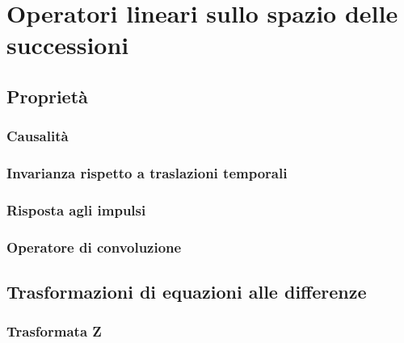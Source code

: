 

\chapter{Operatori lineari sullo spazio delle successioni}
\label{chapter 3}
    \graphicspath{{Chapter3/}}

\section{Proprietà}
\label{section 3.1}

\subsection{Causalità}
\subsection{Invarianza rispetto a traslazioni temporali}
\subsection{Risposta agli impulsi}
\subsection{Operatore di convoluzione}

\section{Trasformazioni di equazioni alle differenze}
\label{section 3.2}

\subsection{Trasformata Z}
